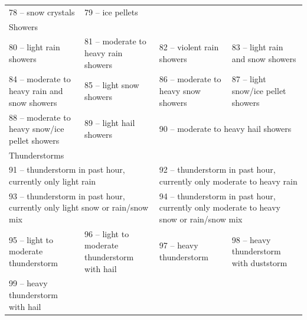 \documentclass{article}
\begin{document}
\begin{description}
\begin{description}
\begin{landscape}
{\begin{tabular}{llll}
        78 -- snow crystals&79 -- ice pellets & & \\
        \multicolumn{4}{l}{Showers}\\
        80 -- light rain showers&81 -- moderate to heavy rain showers&82 -- violent rain showers&83 -- light rain and snow showers\\
        84 -- moderate to heavy rain and snow showers&85 -- light snow showers&86 -- moderate to heavy snow showers&87 -- light snow/ice pellet showers\\
        88 -- moderate to heavy snow/ice pellet showers&89 -- light hail showers&\multicolumn{2}{l}{90 -- moderate to heavy hail showers}\\
        \multicolumn{4}{l}{Thunderstorms}\\
        \multicolumn{2}{l}{91 -- thunderstorm in past hour, currently only light rain}&\multicolumn{2}{l}{92 -- thunderstorm in past hour, currently only moderate to heavy rain}\\
        \multicolumn{2}{l}{93 -- thunderstorm in past hour, currently only light snow or rain/snow mix}&\multicolumn{2}{l}{94 -- thunderstorm in past hour, currently only moderate to heavy snow or rain/snow mix}\\
        95 -- light to moderate thunderstorm&96 -- light to moderate thunderstorm with hail&97 -- heavy thunderstorm&98 -- heavy thunderstorm with duststorm\\
        99 -- heavy thunderstorm with hail & & &\\
      \end{tabular}
    }
\end{landscape}
\newpage
{}
 \setcounter{page}{6}
\end{description}
\end{description}
\end{document}
